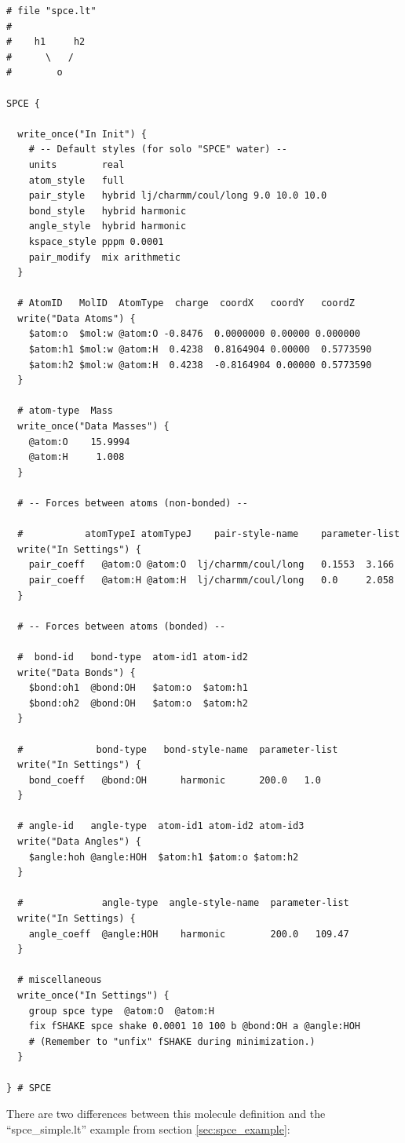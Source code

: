 \documentclass[11pt]{article}
\begin{document}
\begin{verbatim}
# file "spce.lt" 
#
#    h1     h2
#      \   /
#        o

SPCE {

  write_once("In Init") {
    # -- Default styles (for solo "SPCE" water) --
    units        real
    atom_style   full
    pair_style   hybrid lj/charmm/coul/long 9.0 10.0 10.0
    bond_style   hybrid harmonic
    angle_style  hybrid harmonic
    kspace_style pppm 0.0001
    pair_modify  mix arithmetic
  }

  # AtomID   MolID  AtomType  charge  coordX   coordY   coordZ
  write("Data Atoms") {
    $atom:o  $mol:w @atom:O -0.8476  0.0000000 0.00000 0.000000
    $atom:h1 $mol:w @atom:H  0.4238  0.8164904 0.00000  0.5773590
    $atom:h2 $mol:w @atom:H  0.4238  -0.8164904 0.00000 0.5773590
  }

  # atom-type  Mass
  write_once("Data Masses") {
    @atom:O    15.9994
    @atom:H     1.008
  }

  # -- Forces between atoms (non-bonded) --

  #           atomTypeI atomTypeJ    pair-style-name    parameter-list
  write("In Settings") {
    pair_coeff   @atom:O @atom:O  lj/charmm/coul/long   0.1553  3.166 
    pair_coeff   @atom:H @atom:H  lj/charmm/coul/long   0.0     2.058
  }

  # -- Forces between atoms (bonded) --

  #  bond-id   bond-type  atom-id1 atom-id2
  write("Data Bonds") {
    $bond:oh1  @bond:OH   $atom:o  $atom:h1
    $bond:oh2  @bond:OH   $atom:o  $atom:h2
  }

  #             bond-type   bond-style-name  parameter-list
  write("In Settings") {
    bond_coeff   @bond:OH      harmonic      200.0   1.0 
  }

  # angle-id   angle-type  atom-id1 atom-id2 atom-id3
  write("Data Angles") {
    $angle:hoh @angle:HOH  $atom:h1 $atom:o $atom:h2
  }

  #              angle-type  angle-style-name  parameter-list
  write("In Settings) {
    angle_coeff  @angle:HOH    harmonic        200.0   109.47
  }

  # miscellaneous
  write_once("In Settings") {
    group spce type  @atom:O  @atom:H
    fix fSHAKE spce shake 0.0001 10 100 b @bond:OH a @angle:HOH
    # (Remember to "unfix" fSHAKE during minimization.)
  }

} # SPCE
\end{verbatim}
There are two differences between this molecule definition
and the ``spce\_simple.lt'' example from section
\ref{sec:spce_example}:
\end{document}

